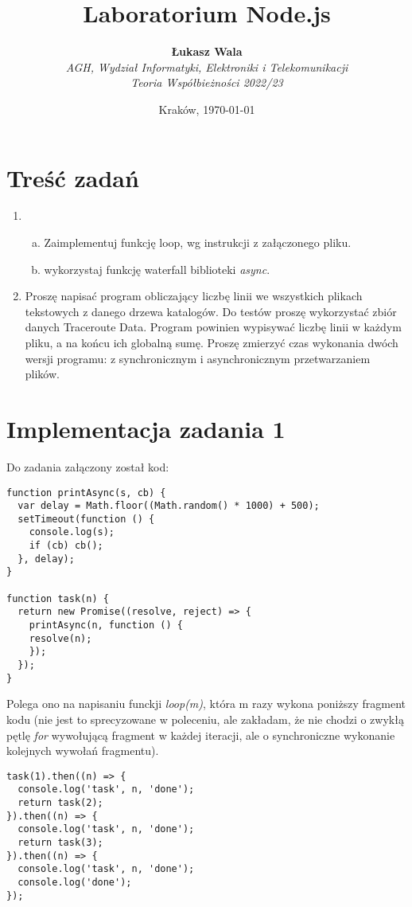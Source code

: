 \documentclass{article}
\title{Laboratorium Node.js}
\author{\textbf{Łukasz Wala}\\
    \textit{AGH, Wydział Informatyki, Elektroniki i Telekomunikacji} \\
    \textit{Teoria Współbieżności 2022/23}}
\date{Kraków, \today}
\begin{document}
\maketitle

\section{Treść zadań}


\begin{enumerate}
    \item 
    \begin{enumerate}[a)]
        \item
        Zaimplementuj funkcję loop, wg instrukcji z załączonego pliku.
        \item 
        wykorzystaj funkcję waterfall biblioteki \textit{async}.
    \end{enumerate}
    \item
    Proszę napisać program obliczający liczbę linii we wszystkich plikach tekstowych z danego drzewa katalogów. 
    Do testów proszę wykorzystać zbiór danych Traceroute Data. Program powinien wypisywać liczbę linii w każdym pliku, 
    a na końcu ich globalną sumę. Proszę zmierzyć czas wykonania dwóch wersji programu: z synchronicznym i asynchronicznym
    przetwarzaniem plików.
\end{enumerate}

\section{Implementacja zadania 1}

Do zadania załączony został kod:

\begin{verbatim}
function printAsync(s, cb) {
  var delay = Math.floor((Math.random() * 1000) + 500);
  setTimeout(function () {
    console.log(s);
    if (cb) cb();
  }, delay);
}
  
function task(n) {
  return new Promise((resolve, reject) => {
    printAsync(n, function () {
    resolve(n);
    });
  });
}
\end{verbatim}

Polega ono na napisaniu funckji \textit{loop(m)}, która m razy wykona poniższy fragment kodu (nie jest to sprecyzowane w
poleceniu, ale zakładam, że nie chodzi o zwykłą pętlę \textit{for} wywołującą fragment w każdej iteracji, ale o synchroniczne
wykonanie kolejnych wywołań fragmentu).

\begin{verbatim}
task(1).then((n) => {
  console.log('task', n, 'done');
  return task(2);
}).then((n) => {
  console.log('task', n, 'done');
  return task(3);
}).then((n) => {
  console.log('task', n, 'done');
  console.log('done');
});
\end{verbatim}
\end{document}
